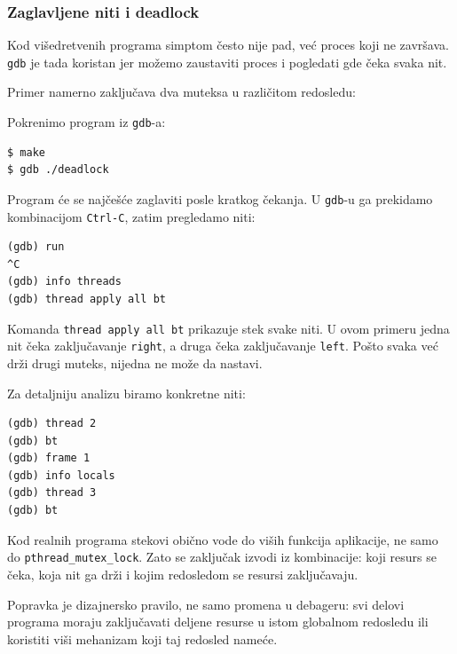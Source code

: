 \subsubsection{Zaglavljene niti i deadlock}\label{gdb-deadlock}

Kod višedretvenih programa simptom često nije pad, već proces koji ne završava. \texttt{gdb} je tada koristan jer možemo zaustaviti proces i pogledati gde čeka svaka nit.

Primer namerno zaključava dva muteksa u različitom redosledu:


Pokrenimo program iz \texttt{gdb}-a:

\begin{verbatim}
$ make
$ gdb ./deadlock
\end{verbatim}

Program će se najčešće zaglaviti posle kratkog čekanja. U \texttt{gdb}-u ga prekidamo kombinacijom \texttt{Ctrl-C}, zatim pregledamo niti:

\begin{verbatim}
(gdb) run
^C
(gdb) info threads
(gdb) thread apply all bt
\end{verbatim}

Komanda \texttt{thread apply all bt} prikazuje stek svake niti. U ovom primeru jedna nit čeka zaključavanje \texttt{right}, a druga čeka zaključavanje \texttt{left}. Pošto svaka već drži drugi muteks, nijedna ne može da nastavi.

Za detaljniju analizu biramo konkretne niti:

\begin{verbatim}
(gdb) thread 2
(gdb) bt
(gdb) frame 1
(gdb) info locals
(gdb) thread 3
(gdb) bt
\end{verbatim}

Kod realnih programa stekovi obično vode do viših funkcija aplikacije, ne samo do \texttt{pthread\_mutex\_lock}. Zato se zaključak izvodi iz kombinacije: koji resurs se čeka, koja nit ga drži i kojim redosledom se resursi zaključavaju.

Popravka je dizajnersko pravilo, ne samo promena u debageru: svi delovi programa moraju zaključavati deljene resurse u istom globalnom redosledu ili koristiti viši mehanizam koji taj redosled nameće.
